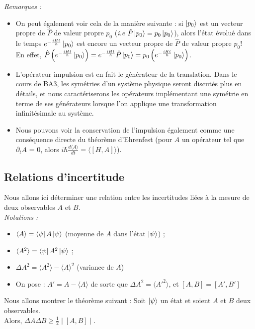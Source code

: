 \documentclass{article}
\begin{document}
\textit{Remarques :} \begin{itemize}[label = \textbullet]
    \item On peut également voir cela de la manière suivante : si $\ket{p_0}$ est un vecteur propre de $\hat{P}$ de valeur propre $p_0$ (\textit{i.e} $\hat{P}\ket{p_0} = p_0 \ket{p_0}$), alors l'état évolué dans le temps $e^{-\frac{iHt}{\hbar}} \ket{p_0}$ est encore un vecteur propre de $\hat{P}$ de valeur propre $p_0$! \\
    En effet, $\hat{P} \left( e^{-\frac{iHt}{\hbar}} \ket{p_0} \right) = e^{-\frac{iHt}{\hbar}} \hat{P} \ket{p_0} = p_0 \left( e^{-\frac{iHt}{\hbar}} \ket{p_0} \right)$. 
    \item L'opérateur impulsion est en fait le générateur de la translation. Dans le cours de BA3, les symétries d'un système physique seront discutés plus en détails, et nous caractériserons les opérateurs implémentant une symétrie en terme de ses générateurs lorsque l'on applique une transformation infinitésimale au système. 
    \item Nous pouvons voir la conservation de l'impulsion également comme une conséquence directe du théorème d'Ehrenfest (pour $A$ un opérateur tel que $\partial_t A$ = 0, alors $i\hbar \frac{d\langle A \rangle}{dt} = \langle [H,A] \rangle$).
\end{itemize}

\subsection*{Relations d'incertitude}

Nous allons ici déterminer une relation entre les incertitudes liées à la mesure de deux observables $A$ et $B$. \\

\textit{Notations :} 
\begin{itemize}[label = \textbullet]
    \item $\langle A \rangle = \bra{\psi} A \ket{\psi}$ (moyenne de $A$ dans l'état $\ket{\psi}$) ; 
    \item $\langle A^2 \rangle = \bra{\psi} A^2 \ket{\psi}$ ; 
    \item $\Delta A^2 = \langle A^2 \rangle - \langle A \rangle^2$ (variance de $A$)
    \item On pose : $A' = A - \langle A \rangle$ de sorte que $\Delta A^2 = \langle A'^2 \rangle$, et $[A,B] = [A', B']$
\end{itemize}

Nous allons montrer le théorème suivant : Soit $\ket{\psi}$ un état et soient $A$ et $B$ deux observables. \\
Alors, $ \Delta A \Delta B \geq \frac{1}{2} \mid [A,B] \mid$. \\
\end{document}
